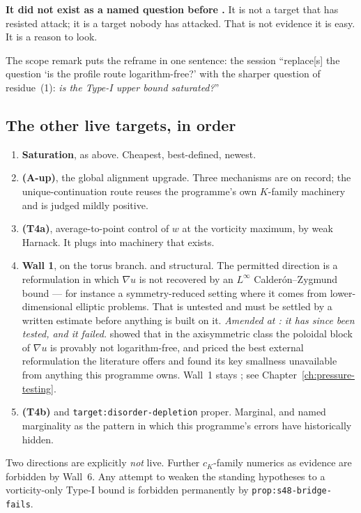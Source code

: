 \textbf{It did not exist as a named question before .} It is not a
target that has resisted attack; it is a target nobody has attacked. That is
not evidence it is easy. It is a reason to look.

The  scope remark puts the reframe in one sentence: the session
``replace[s] the question `is the profile route logarithm-free?' with the
sharper question of residue~(1): \emph{is the Type-I upper bound
saturated?}''

\subsection{The other live targets, in order}

\begin{enumerate}[leftmargin=2.2em]
\item \textbf{Saturation}, as above. Cheapest, best-defined, newest.
\item \textbf{(A-up)}, the global alignment upgrade. Three mechanisms are on
  record; the unique-continuation route reuses the programme's own \(K\)-family
  machinery and is judged mildly positive.
\item \textbf{(T4a)}, average-to-point control of \(w\) at the vorticity
  maximum, by weak Harnack. It plugs into machinery that exists.
\item \textbf{Wall 1}, on the torus branch. \OPEN{} and structural. The
  permitted direction is a reformulation in which \(\nabla u\) is not recovered
  by an \(L^\infty\) Calder\'on--Zygmund bound --- for instance a
  symmetry-reduced setting where it comes from lower-dimensional elliptic
  problems. That is untested and must be settled by a written estimate before
  anything is built on it.
  \emph{Amended at : it has since been tested, and it failed.} 
  showed that in the axisymmetric class the poloidal block of \(\nabla u\) is
  provably not logarithm-free, and  priced the best external
  reformulation the literature offers and found its key smallness unavailable
  from anything this programme owns. Wall~1 stays \OPEN{}; see
  Chapter~\ref{ch:pressure-testing}.
\item \textbf{(T4b)} and \texttt{target:disorder-depletion} proper. Marginal,
  and  named marginality as the pattern in which this programme's
  errors have historically hidden.
\end{enumerate}

Two directions are explicitly \emph{not} live. Further \(c_K\)-family numerics
as evidence are forbidden by Wall~6. Any attempt to weaken the standing
hypotheses to a vorticity-only Type-I bound is forbidden permanently by
\texttt{prop:s48-bridge-fails}.

